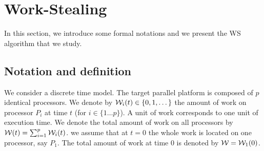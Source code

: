 \section{Work-Stealing}
\label{sec:wsmechanisms}

In this section, we introduce some formal notations and we present the WS algorithm that we study.

\subsection{Notation and definition}

We consider a discrete time model. 
The target parallel platform is composed of $p$ identical processors. We denote
by $\mathcal{W}_{i}(t)\in\{0,1,\dots\}$
 the amount of work on processor $P_{i}$ at time $t$ (for
 $i\in\{1\dots p\}$).
 A unit of work corresponds to one unit of execution time.
 We denote the total amount of work on all processors by
 $\mathcal{W}(t) = \sum_{i=1}^{p} \mathcal{W}_{i}(t)$.
we assume that at $t=0$ the whole work is located on one processor, say $P_{1}$. 
The total amount of work at time $0$
is denoted by $\mathcal{W} = \mathcal{W}_{1}(0)$.

